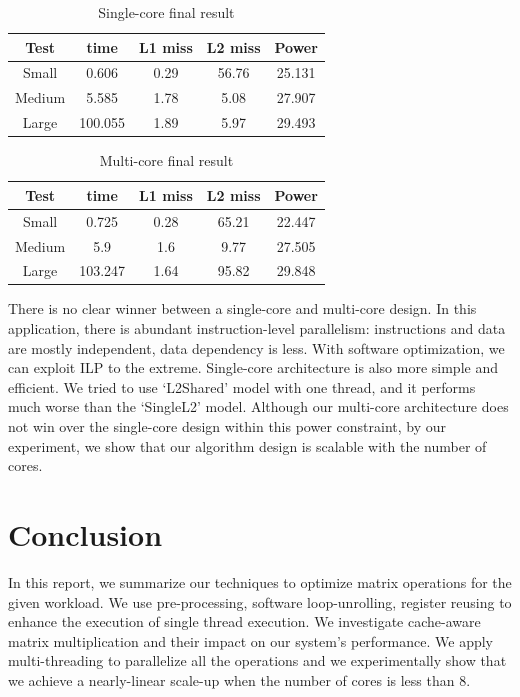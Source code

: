 \documentclass[twocolumn,letterpaper,10pt]{article}
\begin{document}
\begin{table}[ht!]
\begin{center}
\begin{tabular}{ccccc}
\toprule
Test  & time & L1 miss & L2 miss & Power \\
\midrule
Small & 0.606 & 0.29 & 56.76& 25.131 \\
Medium  & 5.585 & 1.78 & 5.08 & 27.907 \\
Large & 100.055 & 1.89 & 5.97 & 29.493 \\
\bottomrule
\end{tabular}
\end{center}
\caption{Single-core final result}
\label{table:single}
\end{table}


\begin{table}[ht!]
\begin{center}
\begin{tabular}{ccccc}
\toprule
Test  & time & L1 miss  & L2 miss & Power \\
\midrule
Small &  0.725 & 0.28 & 65.21 & 22.447 \\
Medium  & 5.9 & 1.6 & 9.77 & 27.505 \\
Large  & 103.247 & 1.64 & 95.82  & 29.848 \\
\bottomrule
\end{tabular}
\end{center}
\caption{Multi-core final result}
\label{table:multi}
\end{table}

There is no clear winner between a single-core and multi-core design. In this application, there is
abundant instruction-level parallelism: instructions and data are
mostly independent, data dependency is less. With software
optimization,  we can exploit ILP to the
extreme. Single-core architecture is also more simple and
efficient. We tried to use `L2Shared' model with one thread, and it performs
much worse than the `SingleL2' model. Although our multi-core architecture does not win over the single-core
design within this power constraint, by our experiment, we show that
our algorithm design is scalable with the number of cores.

\section{Conclusion}
\label{sec:conclude}

In this report, we summarize our techniques to optimize matrix
operations for the given workload. We use pre-processing, software loop-unrolling,
register reusing to enhance the execution of single thread
execution. We investigate cache-aware matrix multiplication and their
impact on our system's performance. We apply multi-threading to
parallelize all the operations and we experimentally show that we
achieve a nearly-linear scale-up when the number of cores is less than 8.
\end{document}
